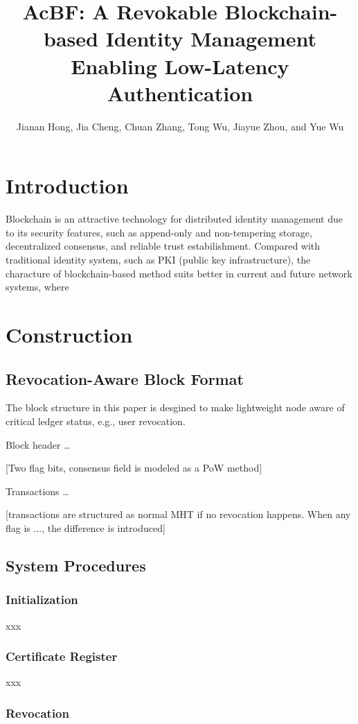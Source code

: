 \documentclass[conference]{IEEEtran}
\title{AcBF: A Revokable Blockchain-based Identity Management Enabling Low-Latency Authentication}
\author{Jianan Hong, Jia Cheng, Chuan Zhang, Tong Wu, Jiayue Zhou, and Yue Wu}
\begin{document}
\maketitle

\section{Introduction}
Blockchain is an attractive technology for distributed identity management due to its security features, such as append-only and non-tempering storage, decentralized consensus, and reliable trust estabilishment. Compared with traditional identity system, such as PKI (public key infrastructure), the characture of blockchain-based method suits better in current and future network systems, where

\section{Construction}
\subsection{Revocation-Aware Block Format}
The block structure in this paper is desgined to make lightweight node aware of critical ledger status, e.g., user revocation. 

Block header \dots

[Two flag bits, consensus field is modeled as a PoW method]

Transactions \dots

[transactions are structured as normal MHT if no revocation happens. When any flag is ..., the difference is introduced]


\subsection{System Procedures}
\subsubsection{Initialization}
xxx

\subsubsection{Certificate Register}
xxx



\subsubsection{Revocation}
\end{document}
